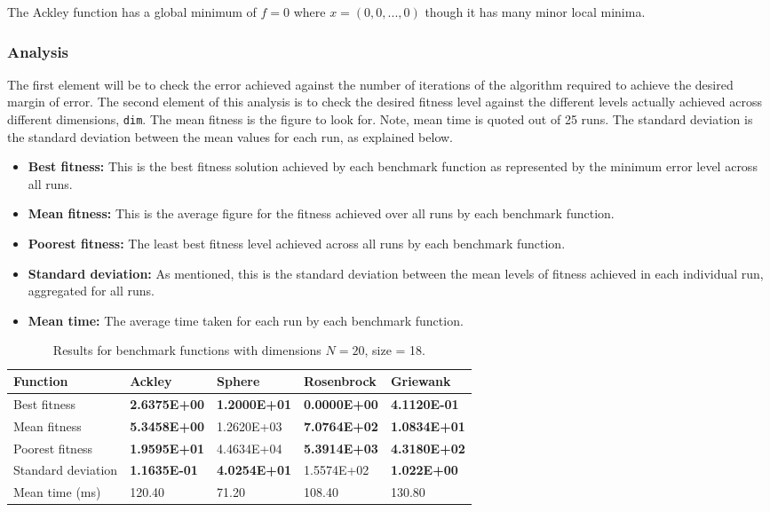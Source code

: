 \documentclass[KomodoMain.tex]{subfiles}
\begin{document}
The Ackley function has a global minimum of $f = 0$ where $x = (0, 0,...,0)$ though it has many minor local minima. 

\subsubsection{Analysis}

The first element will be to check the error achieved against the number of iterations of the algorithm required to achieve the desired margin of error. The second element of this analysis is to check the desired fitness level against the different levels actually achieved across different dimensions, \texttt{dim}. The mean fitness is the figure to look for. Note, mean time is quoted out of 25 runs. The standard deviation is the standard deviation between the mean values for each run, as explained below.

\begin{itemize}
\item \textbf{Best fitness:} This is the best fitness solution achieved by each benchmark function as represented by the minimum error level across all runs.
\item \textbf{Mean fitness:} This is the average figure for the fitness achieved over all runs by each benchmark function.
\item \textbf{Poorest fitness:} The least best fitness level achieved across all runs by each benchmark function.
\item \textbf{Standard deviation:} As mentioned, this is the standard deviation between the mean levels of fitness achieved in each individual run, aggregated for all runs.
\item \textbf{Mean time:} The average time taken for each run by each benchmark function.
\end{itemize}

\newpage
\begin{table}[!htbp]
\small
\caption{ \small Results for benchmark functions with dimensions $N = 20$, size = 18.}
\label{table:X}
\begin{tabular}{ p{3cm} p{2.4cm} p{2.4cm} p{2.4cm} p{2.4cm}}
 \hline
 Function   & Ackley  & Sphere & Rosenbrock & Griewank \\
 \hline
 Best fitness   & \textbf{2.6375E+00}  & \textbf{1.2000E+01} &  \textbf{0.0000E+00} & \textbf{4.1120E-01} \\
 
 Mean fitness & \textbf{5.3458E+00} & 1.2620E+03 & \textbf{7.0764E+02} & \textbf{1.0834E+01} \\
 
 Poorest fitness & \textbf{1.9595E+01} &  4.4634E+04 & \textbf{5.3914E+03} & \textbf{4.3180E+02} \\
 
 Standard deviation & \textbf{1.1635E-01} & \textbf{4.0254E+01} & 1.5574E+02 & \textbf{1.022E+00} \\
 
 Mean time (ms) & 120.40 & 71.20 & 108.40 & 130.80 \\
 \hline
\end{tabular}
\end{table}
\end{document}
